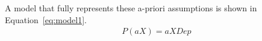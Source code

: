 A model that fully represents these a-priori assumptions is shown in Equation~\ref{eq:model1}.
\begin{align}
    P(aX) = aXDep
\end{align}
